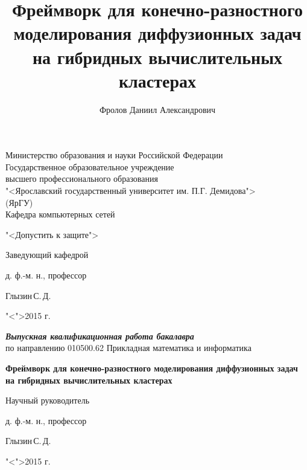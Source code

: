 \documentclass[a4paper, 14pt]{extarticle}
\title{Фреймворк для конечно-разностного моделирования диффузионных задач на гибридных вычислительных кластерах}
\author{Фролов Даниил Александрович}
\theoremstyle{definition}
\begin{document}
\setcounter{tocdepth}{3}

{
\thispagestyle{empty}

\begin{center}
	
	Министерство образования и науки Российской Федерации\\[0.3cm]
	Государственное образовательное учреждение\\
	высшего профессионального образования\\
	"<Ярославский государственный университет им. П.Г. Демидова">\\
	(ЯрГУ)\\[0.3cm]
	
	Кафедра компьютерных сетей
	
	\bigskip
	
	\hspace{15em}"<Допустить к защите">
	
	\begin{flushright}
		Заведующий кафедрой\par
		д. ф.-м. н., профессор\par
		\underline{\hspace{3.2cm}}Глызин\,С.\,Д.\par
		"<\underline{\hspace{0.5cm}}">\underline{\hspace{3.4cm}}2015 г.\par
	\end{flushright}
	
	\bigskip
	
	{\textbf
		{\textit
			{Выпускная квалификационная работа бакалавра}
		}
	}
	\\
	по направлению 010500.62 Прикладная математика и информатика
	
	\bigskip
	
	{\bf
		Фреймворк для конечно-разностного моделирования диффузионных задач на гибридных вычислительных кластерах 
	}
\end{center}

\medskip

\begin{flushright}
	Научный руководитель\par
	д. ф.-м. н., профессор\par
	\underline{\hspace{3.5cm}}Глызин\,С.\,Д.\par
	"<\underline{\hspace{0.8cm}}">\underline{\hspace{3.5cm}}2015 г.\par
\end{flushright}

}
\end{document}
